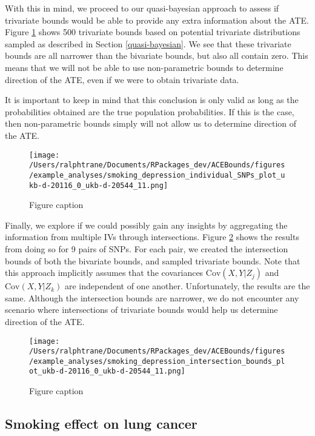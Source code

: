 \documentclass[
]{article}
\theoremstyle{plain}
\begin{document}
With this in mind, we proceed to our quasi-bayesian approach to assess if trivariate bounds would be able to provide any extra information about the ATE. Figure \ref{fig:smoking_on_depression_tri_bounds} shows 500 trivariate bounds based on potential trivariate distributions sampled as described in Section \ref{quasi-bayesian}. We see that these trivariate bounds are all narrower than the bivariate bounds, but also all contain zero. This means that we will not be able to use non-parametric bounds to determine direction of the ATE, even if we were to obtain trivariate data.

It is important to keep in mind that this conclusion is only valid as long as the probabilities obtained are the true population probabilities. If this is the case, then non-parametric bounds simply will not allow us to determine direction of the ATE.

\begin{figure}[!h]
  \centering
  \texttt{[image: /Users/ralphtrane/Documents/RPackages\_dev/ACEBounds/figures/example\_analyses/smoking\_depression\_individual\_SNPs\_plot\_ukb-d-20116\_0\_ukb-d-20544\_11.png]}
  \caption{Figure caption}
  \label{fig:smoking_on_depression_tri_bounds}
\end{figure}

Finally, we explore if we could possibly gain any insights by aggregating the information from multiple IVs through intersections. Figure \ref{fig:smoking_on_depression_intersections} shows the results from doing so for 9 pairs of SNPs. For each pair, we created the intersection bounds of both the bivariate bounds, and sampled trivariate bounds. Note that this approach implicitly assumes that the covariances \(\text{Cov}(X,Y | Z_j)\) and \(\text{Cov}(X,Y | Z_k)\) are independent of one another. Unfortunately, the results are the same. Although the intersection bounds are narrower, we do not encounter any scenario where intersections of trivariate bounds would help us determine direction of the ATE.

\begin{figure}[!h]
  \centering
  \texttt{[image: /Users/ralphtrane/Documents/RPackages\_dev/ACEBounds/figures/example\_analyses/smoking\_depression\_intersection\_bounds\_plot\_ukb-d-20116\_0\_ukb-d-20544\_11.png]}
  \caption{Figure caption}
  \label{fig:smoking_on_depression_intersections}
\end{figure}

\newpage

\hypertarget{smoking-effect-on-lung-cancer}{%
\subsection{Smoking effect on lung cancer}\label{smoking-effect-on-lung-cancer}}
\end{document}
